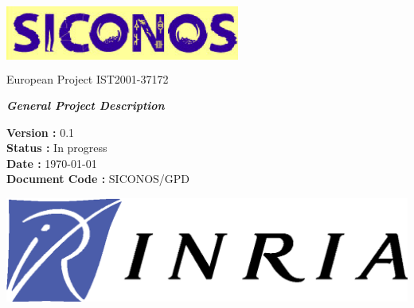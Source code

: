 


%

\thispagestyle{empty}

\begin{center}
\includegraphics[height=23mm, width=77mm]{figure/siconos.eps}\\
\textsf{European Project IST2001-37172}\\[6cm]
\end{center}

\begin{center}
\huge
\textsf{\textbf{\textit{General Project Description}}}\\[2.5cm]
\end{center}

\large
\begin{center}
\textsf{\textbf{Version :} 0.1}\\
\textsf{\textbf{Status :}  In progress}\\
\textsf{\textbf{Date : } \today}\\
\textsf{\textbf{Document Code :} SICONOS/GPD}\\[5cm]

\end{center}

\normalsize

\begin{flushright}
\includegraphics[scale=0.3]{figure/Logo-INRIA.eps}
\end{flushright}

\clearpage





